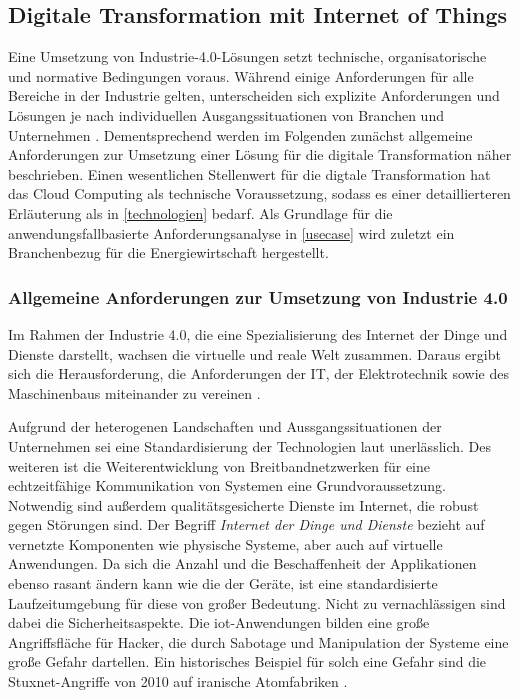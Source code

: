 \subsection{Digitale Transformation mit Internet of Things}

Eine Umsetzung von Industrie-4.0-Lösungen setzt technische, organisatorische und normative Bedingungen voraus. Während einige Anforderungen für alle Bereiche in der Industrie gelten, unterscheiden sich explizite Anforderungen und Lösungen je nach individuellen Ausgangssituationen von Branchen und Unternehmen \citep{Bauer2014}. Dementsprechend werden im Folgenden zunächst allgemeine Anforderungen zur Umsetzung einer Lösung für die digitale Transformation näher beschrieben. Einen wesentlichen Stellenwert für die digtale Transformation hat das Cloud Computing als technische Voraussetzung, sodass es einer detaillierteren Erläuterung als in \ref{technologien} bedarf. Als Grundlage für die anwendungsfallbasierte Anforderungsanalyse in \ref{usecase} wird zuletzt ein Branchenbezug für die Energiewirtschaft hergestellt.

\subsubsection{Allgemeine Anforderungen zur Umsetzung von Industrie 4.0}

Im Rahmen der Industrie 4.0, die eine Spezialisierung des Internet der Dinge und Dienste darstellt, wachsen die virtuelle und reale Welt zusammen. Daraus ergibt sich die Herausforderung, die Anforderungen der IT, der Elektrotechnik sowie des Maschinenbaus miteinander zu vereinen \citep{Huebner2017}.

Aufgrund der heterogenen Landschaften und Aussgangssituationen der Unternehmen sei eine Standardisierung der Technologien laut \citet{Bauer2014} unerlässlich. Des weiteren ist die Weiterentwicklung von Breitbandnetzwerken für eine echtzeitfähige Kommunikation von Systemen eine Grundvoraussetzung. Notwendig sind außerdem qualitätsgesicherte Dienste im Internet, die robust gegen Störungen sind. Der Begriff \textit{Internet der Dinge und Dienste} bezieht auf vernetzte Komponenten wie physische Systeme, aber auch auf virtuelle Anwendungen. Da sich die Anzahl und die Beschaffenheit der Applikationen ebenso rasant ändern kann wie die der Geräte, ist eine standardisierte Laufzeitumgebung für diese von großer Bedeutung. Nicht zu vernachlässigen sind dabei die Sicherheitsaspekte. Die \ac{iot}-Anwendungen bilden eine große Angriffsfläche für Hacker, die durch Sabotage und Manipulation der Systeme eine große Gefahr dartellen. Ein historisches Beispiel für solch eine Gefahr sind die Stuxnet-Angriffe von 2010 auf iranische Atomfabriken \citep{Bauer2014}.

